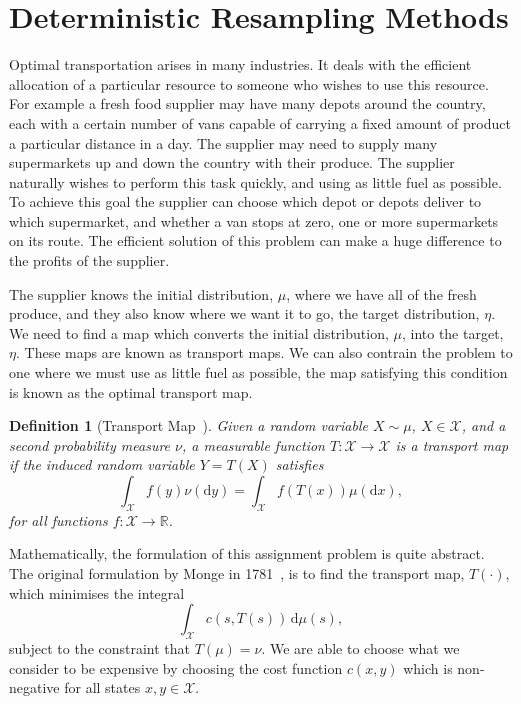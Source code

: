 \documentclass[final]{siamltex}
\newtheorem{dfn}{Definition}[section]
\begin{document}
\section{Deterministic Resampling Methods}\label{sec:intro_optim}

Optimal transportation arises in many industries. It deals with the efficient allocation
of a particular resource to someone who wishes to use this resource. For example a fresh food
supplier may have many depots around the country, each with a certain number of vans capable of
carrying a fixed amount of product a particular distance in a day. The supplier may need to supply
many supermarkets up and down the country with their produce. The supplier naturally wishes to
perform this task quickly, and using as little fuel as possible. To achieve this goal the supplier
can choose which depot or depots deliver to which supermarket, and whether a van stops at zero, one
or more supermarkets on its route. The efficient solution of this problem can make a huge difference
to the profits of the supplier.

The supplier knows the initial distribution, $\mu$, where we have all of the fresh produce,
and they also know where we want it to go, the target distribution, $\eta$. We need to find a map which converts
the initial distribution, $\mu$, into the target, $\eta$. These
maps are known as transport maps. We can also contrain the problem to one where we must use as little fuel as possible, the map satisfying this condition is known as the optimal transport map.

\begin{dfn}[Transport Map~\cite{reich2013ensemble}]\label{def:transport_map}
Given a random variable $X \sim \mu$, $X \in \mathcal{X}$, and a second probability measure $\nu$, a
measurable function $T\colon \mathcal{X}\rightarrow\mathcal{X}$ is a transport map if the induced
random variable $Y = T(X)$ satisfies
\[
	\int_\mathcal{X} \! f(y)\nu(\text{d}y) = \int_\mathcal{X} \! f(T(x))\mu(\text{d}x),
\]
for all functions $f\colon \mathcal{X} \rightarrow \mathbb{R}$.
\end{dfn}

Mathematically, the formulation of this assignment problem is quite abstract. The original
formulation by Monge in 1781~\cite{monge1781memoire}, is to find the transport map, $T(\cdot)$,
which minimises the integral
\[
	\int_\mathcal{X} \! c(s, T(s)) \, \text{d}\mu(s),
\]
subject to the constraint that $T(\mu) = \nu$. We are able to choose what we consider to be
expensive by choosing the cost function $c(x,y)$ which is non-negative for all states
$x,y\in\mathcal{X}$.
\end{document}
